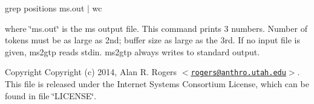 grep positions ms.\-out $|$ wc

where \char`\"{}ms.\-out\char`\"{} is the ms output file. \-This command prints 3 numbers. \-Number of tokens must be as large as 2nd; buffer size as large as the 3rd. \-If no input file is given, ms2gtp reads stdin. ms2gtp always writes to standard output.

\begin{DoxyCopyright}{\-Copyright}
\-Copyright (c) 2014, \-Alan \-R. \-Rogers $<$\href{mailto:rogers@anthro.utah.edu}{\tt rogers@anthro.\-utah.\-edu}$>$. \-This file is released under the \-Internet \-Systems \-Consortium \-License, which can be found in file \char`\"{}\-L\-I\-C\-E\-N\-S\-E\char`\"{}. 
\end{DoxyCopyright}
